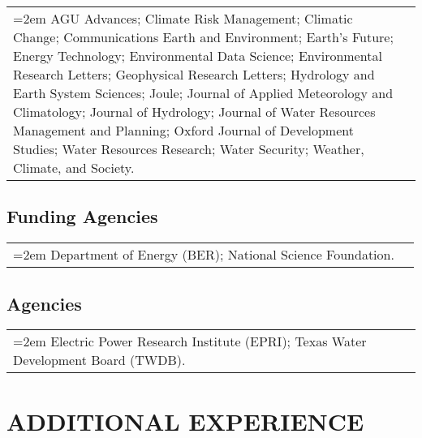 \documentclass[10pt,oneside]{article}
\makeatletter
\newenvironment{alignedentrieshang}[1][2em]{%
  \noindent%
}{%
}
\newcommand{\hangingitem}[2]{%
  \noindent%
  \begin{tabular*}{\textwidth}{@{}p{0.85\textwidth}@{\extracolsep{\fill}}r@{}}%
    \hangindent=2em \hangafter=1 #1 & #2%
  \end{tabular*}%
}
\makeatother
\begin{document}
\begin{alignedentrieshang}[2em]

  \hangingitem{AGU Advances; Climate Risk Management; Climatic Change; Communications Earth and Environment; Earth's Future; Energy Technology; Environmental Data Science; Environmental Research Letters; Geophysical Research Letters; Hydrology and Earth System Sciences; Joule; Journal of Applied Meteorology and Climatology; Journal of Hydrology; Journal of Water Resources Management and Planning; Oxford Journal of Development Studies; Water Resources Research; Water Security; Weather, Climate, and Society.
  }{}


\end{alignedentrieshang}


\subsection{Funding Agencies}

\begin{alignedentrieshang}[2em]

  \hangingitem{Department of Energy (BER); National Science Foundation.
  }{}


\end{alignedentrieshang}


\subsection{Agencies}

\begin{alignedentrieshang}[2em]

  \hangingitem{Electric Power Research Institute (EPRI); Texas Water Development Board (TWDB).
  }{}


\end{alignedentrieshang}


\section{ADDITIONAL EXPERIENCE}
\end{document}
